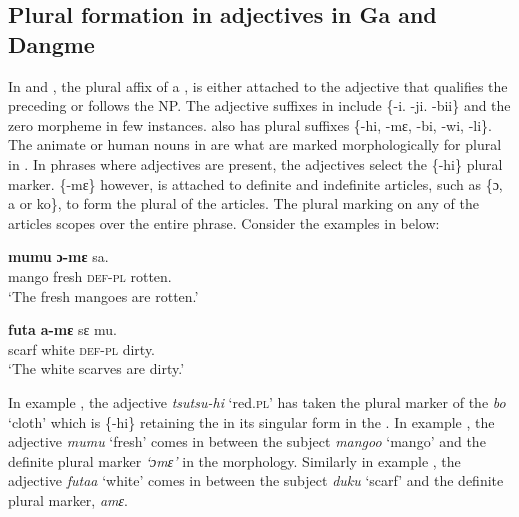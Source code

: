 \documentclass[output=paper,
modfonts
]{langscibook}
\begin{document}
\subsection{Plural formation in adjectives in Ga and Dangme}

In  and , the plural affix of a , is either attached to the adjective that qualifies the preceding  or follows the NP. The adjective suffixes in  include \{-i. -ji. -bii\} and the zero morpheme in few instances.  also has  plural suffixes \{-hi, -mɛ, -bi, -wi, -li\}. The animate or human nouns in  are what are marked morphologically for plural in . In  phrases where adjectives are present, the adjectives select the \{-hi\} plural marker. \{-mɛ\} however, is attached to definite and indefinite articles, such as \{ɔ, a or ko\}, to form the plural of the articles. The plural marking on any of the articles scopes over the entire  phrase. Consider the examples in  below:




\ea\label{ex:caesar:9}
  \textbf{{mumu}} \textbf{{ɔ{}-mɛ}} {sa.}\\
mango fresh \textsc{def}-\textsc{pl} rotten.\\
\glt ‘The fresh mangoes are rotten.’
\z


\ea\label{ex:caesar:10}
 \textbf{{futa}} \textbf{{a-mɛ}} {sɛ mu.}\\
scarf white \textsc{def}-\textsc{pl} dirty.\\
\glt ‘The white scarves are dirty.’
\z




In example , the adjective \textit{tsutsu-hi} ‘red.\textsc{pl}’ has taken the plural marker of the  \textit{bo} ‘cloth’ which is \{-hi\} retaining the  in its singular form in the . In example , the adjective \textit{mumu} ‘fresh’ comes in between the subject  \textit{mangoo} ‘mango’ and the definite plural marker \textit{‘ɔmɛ’} in the morphology. Similarly in example , the adjective \textit{futaa} ‘white’ comes in between the subject  \textit{duku} ‘scarf’ and the definite plural marker, \textit{amɛ}.
\end{document}
